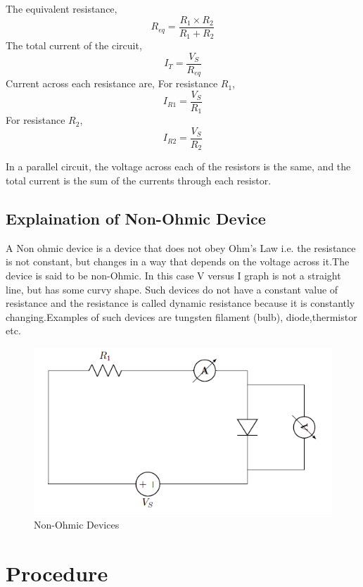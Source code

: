 			The equivalent resistance,
			$$ R_{eq}=\frac{R_1 \times R_2}{R_1+R_2}$$
			The total current of the circuit,
			$$I_T=\frac{V_S}{R_{eq}}$$
			Current across each resistance are,
			For resistance \(R_1\),
			$$ I_{R1}=\frac{V_S}{R_1}$$
			For resistance \(R_2\),
			$$ I_{R2}=\frac{V_S}{R_2}$$
			
			In a parallel circuit, the voltage across each of the resistors is the same, and the total current is the sum of the currents through each resistor.
			
		\subsection{Explaination of Non-Ohmic Device}
			A Non ohmic device is a device that does not obey Ohm's Law i.e. the resistance is not constant, but changes in a way that depends on the voltage across it.The device is said to be non-Ohmic. In this case V versus I graph is not a straight line, but has some curvy shape. Such devices do not have a constant value of resistance and the resistance is called dynamic resistance because it is constantly changing.Examples of such devices are tungsten filament (bulb), diode,thermistor etc.
			\begin{figure}[h]
				\centering
				\includegraphics[width=0.5\linewidth]{img/exp4/4}
				\caption{Non-Ohmic Devices}
				\label{fig:nonOhmicDevices}
			\end{figure}
			
	\section{Procedure}
